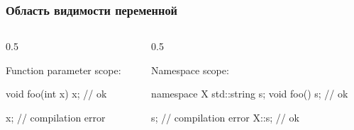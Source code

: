 \documentclass[compress, 8pt, aspectratio=169]{beamer}
\begin{document}
\begin{frame}[fragile]

    \frametitle{Область видимости переменной}

    \begin{columns}[T]

        \begin{column}{0.5\textwidth}

            Function parameter scope:

            \begin{myinplacelisting}[minted language=cpp]
void foo(int x) {
    x; // ok
}

x; // compilation error
            \end{myinplacelisting}

        \end{column}

        \begin{column}{0.5\textwidth}

            Namespace scope:

            \begin{myinplacelisting}[minted language=cpp]
namespace X {
    std::string s;
    void foo() {
        s; // ok
    }
}

s; // compilation error
X::s; // ok
            \end{myinplacelisting}

        \end{column}

    \end{columns}

\end{frame}
\end{document}
